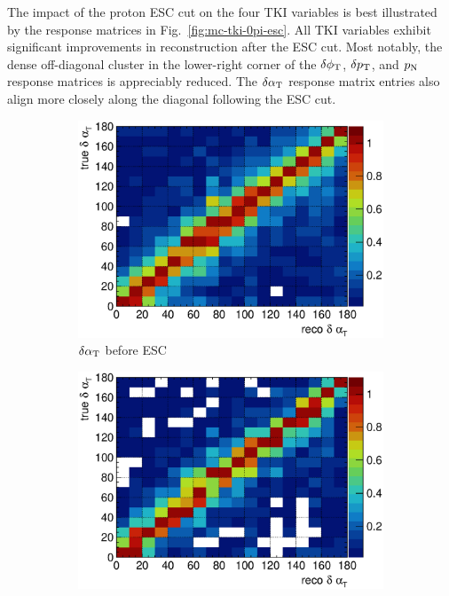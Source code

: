           The impact of the proton ESC cut on the four TKI variables is best illustrated by the response matrices in Fig.~\ref{fig:mc-tki-0pi-esc}.
          All TKI variables exhibit significant improvements in reconstruction after the ESC cut.
          Most notably, the dense off-diagonal cluster in the lower-right corner of the $\delta\phi_\textrm{T}$, $\delta p_\textrm{T}$, and $p_\textrm{N}$ response matrices is appreciably reduced.
          The $\delta\alpha_\textrm{T}$ response matrix entries also align more closely along the diagonal following the ESC cut.
          \begin{figure}
          \centering
          \begin{subfigure}[b]{\dbfigwid\textwidth}
               \centering
               \includegraphics[width=\textwidth]{figures/perf/tki/dalphat_colnor_resmat_al13.eps}
               \caption{$\delta\alpha_\textrm{T}$ before ESC}
               \label{subfig:esc-dalpha-bfesc}
          \end{subfigure}
          \begin{subfigure}[b]{\dbfigwid\textwidth}
               \centering
               \includegraphics[width=\textwidth]{figures/perf/tki/dalphat_colnor_resmat_al14.eps}

\end{subfigure}
\end{figure}
